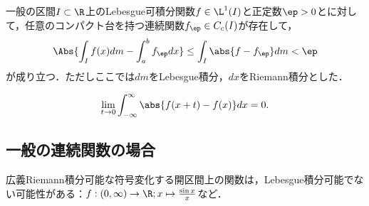 \documentclass[uplatex, dvipdfmx]{jsreport}
\begin{document}
\begin{theorem}
    一般の区間$I\subset\R$上のLebesgue可積分関数$f\in\L^1(I)$と正定数$\ep>0$とに対して，任意のコンパクト台を持つ連続関数$f_\ep\in C_c(I)$が存在して，
    \[\Abs{\int_If(x)dm-\int^b_af_\ep dx}\le\int_I\abs{f-f_\ep}dm<\ep\]
    が成り立つ．ただしここでは$dm$をLebesgue積分，$dx$をRiemann積分とした．
\end{theorem}

\begin{corollary}
    \[\lim_{t\to0}\int^\infty_{-\infty}\abs{f(x+t)-f(x)}dx=0.\]
\end{corollary}

\subsection{一般の連続関数の場合}

\begin{tcolorbox}[colframe=ForestGreen, colback=ForestGreen!10!white,breakable,colbacktitle=ForestGreen!40!white,coltitle=black,fonttitle=\bfseries\sffamily,
title=]
    広義Riemann積分可能な符号変化する開区間上の関数は，Lebesgue積分可能でない可能性がある：$f:(0,\infty)\to\R;x\mapsto\frac{\sin x}{x}$など．
\end{tcolorbox}
\end{document}
